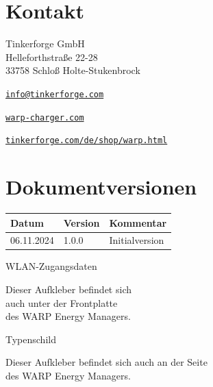 \documentclass[a4paper,10pt]{article}
\begin{document}
\begin{multicols*}{2}
    \section{Kontakt}
    Tinkerforge GmbH\\ Helleforthstraße 22-28\\ 33758 Schloß Holte-Stukenbrock
    \begin{description}[leftmargin=!,labelwidth=\widthof{\textbf{Website}}]
        \item[E-Mail] \href{mailto:info@tinkerforge.com}{\texttt{info@tinkerforge.com}}
        \item[Website] \href{https://warp-charger.com}{\texttt{warp-charger.com}}
        \item[Telefon] 
        \item[Shop] \href{https://tinkerforge.com/de/shop/warp.html}{\texttt{tinkerforge.com/de/shop/warp.html}}
    \end{description}

	\section{Dokumentversionen}
	\begin{tabular}{lll}
		\toprule
		Datum      & Version & Kommentar                       \\
		\midrule
		06.11.2024 & 1.0.0   & Initialversion                  \\
		\bottomrule
	\end{tabular}

	\vfill
	\null
	\newpage

	\columnbreak

    \end{multicols*}

    \appendix

	\newpage
	\pagecolor{covergray}\afterpage{\nopagecolor}

   \begin{multicols*}{2}
    \pagestyle{empty}
    \null
    \vfill
	\color{white}
    WLAN-Zugangsdaten
    \begin{tcolorbox}[width=4.2cm,height=2.7cm, boxrule=0.25mm]

    \end{tcolorbox}
	Dieser Aufkleber befindet sich\\ auch unter der Frontplatte\\des WARP Energy
	Managers.
    \columnbreak

    \null
    \vfill
    Typenschild
    \begin{tcolorbox}[width=7.8cm,height=4.1cm, boxrule=0.25mm]

    \end{tcolorbox}
    Dieser Aufkleber befindet sich auch an der Seite\\ des WARP Energy Managers.
\end{multicols*}
\end{document}
